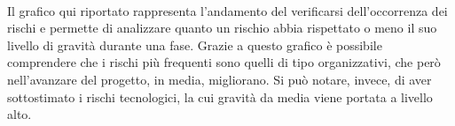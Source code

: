 \mbox{}\\
Il grafico qui riportato rappresenta l'andamento del verificarsi dell'occorrenza dei rischi e permette di analizzare quanto un rischio abbia rispettato o meno il suo livello di gravità durante una fase.
Grazie a questo grafico è possibile comprendere che i rischi più frequenti sono quelli di tipo organizzativi, che però nell'avanzare del progetto, in media, migliorano.
Si può notare, invece, di aver sottostimato i rischi tecnologici, la cui gravità da media viene portata a livello alto.